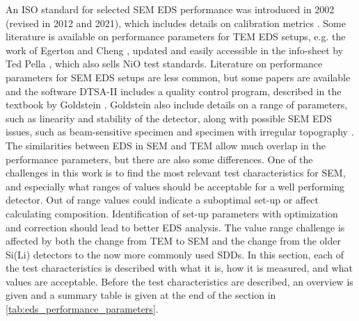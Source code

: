 An ISO standard for selected SEM EDS performance was introduced in 2002 (revised in 2012 and 2021), which includes details on calibration metrics \cite{iso_qc_15632}.
Some literature is available on performance parameters for TEM EDS setups, e.g. the work of Egerton and Cheng \cite{egerton_nio_characterization_1994}, updated and easily accessible in the info-sheet by Ted Pella \cite{ted_pella_nio_tem_2019}, which also sells NiO test standards.
Literature on performance parameters for SEM EDS setups are less common, but some papers \cite{software_dtsaii,dtsaii_1_getting_started,dtsaii_2_manipulating_spectra} are available and the software DTSA-II includes a quality control program, described in the textbook by Goldstein \cite{goldstein_scanning_2018}.
Goldstein also include details on a range of parameters, such as linearity and stability of the detector, along with possible SEM EDS issues, such as beam-sensitive specimen and specimen with irregular topography \cite{goldstein_scanning_2018}.
The similarities between EDS in SEM and TEM allow much overlap in the performance parameters, but there are also some differences.
One of the challenges in this work is to find the most relevant test characteristics for SEM, and especially what ranges of values should be acceptable for a well performing detector.
Out of range values could indicate a suboptimal set-up or affect calculating composition.
Identification of set-up parameters with optimization and correction should lead to better EDS analysis.
The value range challenge is affected by both the change from TEM to SEM and the change from the older Si(Li) detectors to the now more commonly used SDDs.
In this section, each of the test characteristics is described with what it is, how it is measured, and what values are acceptable.
Before the test characteristics are described, an overview is given and a summary table is given at the end of the section in \cref{tab:eds_performance_parameters}.



